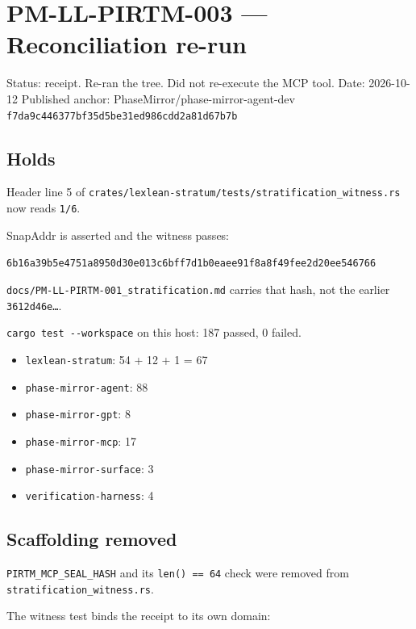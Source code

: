 \documentclass[
]{article}
\author{}
\date{}
\providecommand{\tightlist}{%
  \setlength{\itemsep}{0pt}\setlength{\parskip}{0pt}}
\begin{document}
\hypertarget{pm-ll-pirtm-003-reconciliation-re-run}{%
\section{PM-LL-PIRTM-003 --- Reconciliation
re-run}\label{pm-ll-pirtm-003-reconciliation-re-run}}

Status: receipt. Re-ran the tree. Did not re-execute the MCP tool. Date:
2026-10-12 Published anchor: PhaseMirror/phase-mirror-agent-dev
\texttt{f7da9c446377bf35d5be31ed986cdd2a81d67b7b}

\hypertarget{holds}{%
\subsection{Holds}\label{holds}}

Header line 5 of
\texttt{crates/lexlean-stratum/tests/stratification\_witness.rs} now
reads \texttt{1/6}.

SnapAddr is asserted and the witness passes:

\texttt{6b16a39b5e4751a8950d30e013c6bff7d1b0eaee91f8a8f49fee2d20ee546766}

\texttt{docs/PM-LL-PIRTM-001\_stratification.md} carries that hash, not
the earlier \texttt{3612d46e…}.

\texttt{cargo\ test\ -\/-workspace} on this host: 187 passed, 0 failed.

\begin{itemize}
\tightlist
\item
  \texttt{lexlean-stratum}: 54 + 12 + 1 = 67
\item
  \texttt{phase-mirror-agent}: 88
\item
  \texttt{phase-mirror-gpt}: 8
\item
  \texttt{phase-mirror-mcp}: 17
\item
  \texttt{phase-mirror-surface}: 3
\item
  \texttt{verification-harness}: 4
\end{itemize}

\hypertarget{scaffolding-removed}{%
\subsection{Scaffolding removed}\label{scaffolding-removed}}

\texttt{PIRTM\_MCP\_SEAL\_HASH} and its \texttt{len()\ ==\ 64} check
were removed from \texttt{stratification\_witness.rs}.

The witness test binds the receipt to its own domain:
\end{document}
